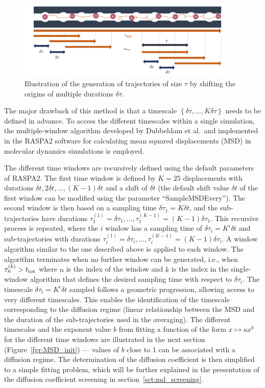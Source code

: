 \documentclass[main]{subfiles}
\begin{document}
\begin{figure}[ht]
  \centering
    \includegraphics[width=0.95\textwidth]{figures/5-diffusion/diffusion_averaging.pdf}
    \caption{Illustration of the generation of trajectories of size $\tau$ by shifting the origins of multiple durations $\delta\tau$. }\label{fgr:window_msd}
\end{figure}

The major drawback of this method is that a timescale $\left\{\delta\tau, \ldots, K\delta\tau\right\}$ needs to be defined in advance. To access the different timescales within a single simulation, the multiple-window algorithm developed by Dubbeldam et al.\ and implemented in the RASPA2 software for calculating mean squared displacements (MSD) in molecular dynamics simulations is employed.

The different time windows are recursively defined using the default parameters of RASPA2. The first time window is defined by $K=25$ displacements with durations $\delta t, 2\delta t, \ldots,(K-1)\delta t$ and a shift of $\delta t$ (the default shift value $\delta t$ of the first window can be modified using the parameter ``SampleMSDEvery''). The second window is then based on a sampling time $\delta \tau_1 = K\delta t$, and the sub-trajectories have durations $\tau_1^{(1)} = \delta\tau_1,\ldots,\tau_1^{(K-1)} = (K-1)\delta\tau_1$. This recursive process is repeated, where the $i$ window has a sampling time of $\delta \tau_i = K^i\delta t$ and sub-trajectories with durations $\tau_i^{(1)} = \delta\tau_i,\ldots,\tau_i^{(K-1)} = (K-1)\delta\tau_i$. A window algorithm similar to the one described above is applied to each window. The algorithm terminates when no further window can be generated, i.e., when $\tau_n^{(k)}>t_{\text{tot}}$ where $n$ is the index of the window and $k$ is the index in the single-window algorithm that defines the desired sampling time with respect to $\delta\tau_i$. The timescale $\delta \tau_i = K^i\delta t$ sampled follows a geometric progression, allowing access to very different timescales. This enables the identification of the timescale corresponding to the diffusion regime (linear relationship between the MSD and the duration of the sub-trajectories used in the averaging). The different timescales and the exponent value $b$ from fitting a function of the form $x \mapsto ax^b$ for the different time windows are illustrated in the next section (Figure~\ref{fgr:MSD_init}) --- values of $b$ close to $1$ can be associated with a diffusion regime. The determination of the diffusion coefficient is then simplified to a simple fitting problem, which will be further explained in the presentation of the diffusion coefficient screening in section~\ref{sct:md_screening}.
\end{document}

